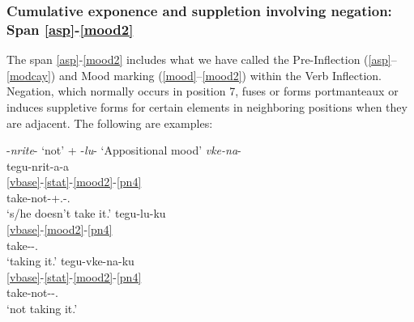 \documentclass[output=paper]{langscibook}
\begin{document}
\subsubsection{Cumulative exponence and suppletion involving negation: Span \ref{asp}-\ref{mood2}} \label{sec:5.8.2}

The span \ref{asp}-\ref{mood2} includes what we have called the Pre-Inflection (\ref{asp}--\ref{modcay}) and Mood marking (\ref{mood}--\ref{mood2}) within the Verb Inflection. Negation, which normally occurs in position 7, fuses or forms portmanteaux or induces suppletive forms for certain elements in neighboring positions when they are adjacent. The following are examples:

\ea\label{ex:key:49}
{{}-\textit{nrite}{}- `not'  + -\textit{lu}{}- `Appositional mood'  \MVRightarrow {} \textit{vke-na}{}-}\\
\ea\label{ex:key:49a}
\glll tegu-nrit-a-a\\
    \ref{vbase}-\ref{stat}-\ref{mood2}-\ref{pn4} \\
     take-not-\Ind{}+\Third\Sg.\Obj{}-\Third\Sg.\Aarg{}\\
\glt `s/he doesn't take it.'
\ex\label{ex:key:49b}
\glll tegu-lu-ku\\
    \ref{vbase}-\ref{mood2}-\ref{pn4}\\
     take-\Appos-\Tsg.\Obj{}\\
\glt `taking it.'
\ex\label{ex:key:49c}
\glll tegu-vke-na-ku\\
    \ref{vbase}-\ref{stat}-\ref{mood2}-\ref{pn4}\\
     take-not-\Appos-\Tsg.\Obj{}\\
\glt `not taking it.'
\z
\z
\end{document}
